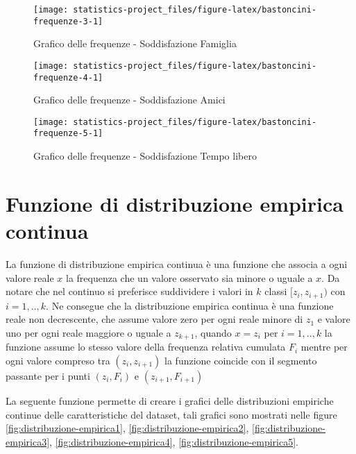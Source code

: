 \documentclass[]{book}
\begin{document}
\begin{figure}

{\centering \texttt{[image: statistics-project\_files/figure-latex/bastoncini-frequenze-3-1]} 

}

\caption{Grafico delle frequenze - Soddisfazione Famiglia}\label{fig:bastoncini-frequenze-3}
\end{figure}

\begin{figure}

{\centering \texttt{[image: statistics-project\_files/figure-latex/bastoncini-frequenze-4-1]} 

}

\caption{Grafico delle frequenze - Soddisfazione Amici}\label{fig:bastoncini-frequenze-4}
\end{figure}

\begin{figure}

{\centering \texttt{[image: statistics-project\_files/figure-latex/bastoncini-frequenze-5-1]} 

}

\caption{Grafico delle frequenze - Soddisfazione Tempo libero}\label{fig:bastoncini-frequenze-5}
\end{figure}

\section{Funzione di distribuzione empirica
continua}\label{funzione-di-distribuzione-empirica-continua}

La funzione di distribuzione empirica continua è una funzione che
associa a ogni valore reale \(x\) la frequenza che un valore osservato
sia minore o uguale a \(x\). Da notare che nel continuo si preferisce
suddividere i valori in \(k\) classi \([z_i, z_{i+1})\) con
\(i = 1,..,k\). Ne consegue che la distribuzione empirica continua è una
funzione reale non decrescente, che assume valore zero per ogni reale
minore di \(z_1\) e valore uno per ogni reale maggiore o uguale a
\(z_{k+1}\), quando \(x = z_i\) per \(i = 1,..,k\) la funzione assume lo
stesso valore della frequenza relativa cumulata \(F_i\) mentre per ogni
valore compreso tra \((z_i, z_{i+1})\) la funzione coincide con il
segmento passante per i punti \((z_i, F_i)\) e \((z_{i+1}, F_{i+1})\)

La seguente funzione permette di creare i grafici delle distribuzioni
empiriche continue delle caratteristiche del dataset, tali grafici sono
mostrati nelle figure \ref{fig:distribuzione-empirica1},
\ref{fig:distribuzione-empirica2}, \ref{fig:distribuzione-empirica3},
\ref{fig:distribuzione-empirica4}, \ref{fig:distribuzione-empirica5}.
\end{document}
